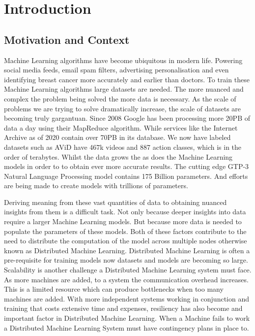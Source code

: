 
\section{Introduction}

\subsection{Motivation and Context}
Machine Learning algorithms have become ubiquitous in modern life. Powering
social media feeds, email spam filters, advertising personalisation and even
identifying breast cancer more accurately and earlier than doctors.
\cite{Mammograms2020} To train these Machine Learning algorithms large datasets
are needed. The more nuanced and complex the problem being solved the more data
is necessary. As the scale of problems we are trying to solve dramatically
increase, the scale of datasets are becoming truly gargantuan. Since 2008 Google
has been processing more 20PB of data a day using their MapReduce algorithm.
\cite{googlemapreduce2008} While services like the Internet Archive as of 2020
contain over 70PB in its database. We now have labeled datasets such as AViD
have 467k videos and 887 action classes, which is in the order of terabytes.
\cite{piergiovanni2020avid} 
Whilst the data grows the as does the Machine Learning models in order to to
obtain ever more accurate results. The cutting edge GTP-3 Natural Language
Processing model contains 175 Billion parameters. \cite{fewshowlearners2020gpt}
And efforts are being made to create models with trillions of parameters.
\cite{rajbhandari2020zero}
\par

Deriving meaning from these vast quantities of data to obtaining nuanced
insights from them is a difficult task. Not only because deeper insights into
data require a larger Machine Learning models. But because more data is needed
to populate the parameters of these models. Both of these factors contribute to
the need to distribute the computation of the model across multiple nodes
otherwise known as Distributed Machine Learning. Distributed Machine Learning is
often a pre-requisite for training models now datasets and models are becoming
so large. \cite{LI2014ParameterServers} Scalability is another challenge a
Distributed Machine Learning system must face. As more machines are added, to a
system the communication overhead increases. This is a limited resource which
can produce bottlenecks when too many machines are added. With more independent
systems working in conjunction and training that costs extensive time and
expenses, resiliency has also become and important factor in Distributed Machine
Learning. When a Machine fails to work a Distributed Machine Learning System
must have contingency plans in place to.
\par

